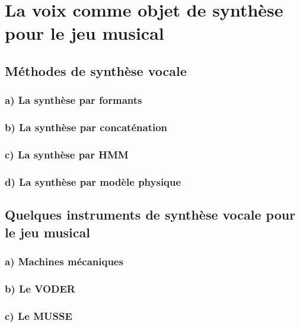 \section{La voix comme objet de synthèse pour le jeu musical}
\lipsum[1-1]

\subsection{Méthodes de synthèse vocale}
\lipsum[1-1]

\subsubsection{a) La synthèse par formants}
\label{sec:synthFormants}
\lipsum[1-1]

\subsubsection{b) La synthèse par concaténation}
\lipsum[1-1]

\subsubsection{c) La synthèse par HMM}
\lipsum[1-1]

\subsubsection{d) La synthèse par modèle physique}
\lipsum[1-1]

\subsection{Quelques instruments de synthèse vocale pour le jeu musical}
\label{sec:qqIntrus}
\lipsum[1-1]

\subsubsection{a) Machines mécaniques}
\label{Sec:macMec}
\lipsum[1-1]

\subsubsection{b) Le VODER}
\lipsum[1-1]

\subsubsection{c) Le MUSSE}
\lipsum[1-1]

